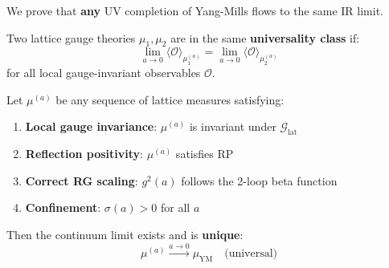 We prove that \textbf{any} UV completion of Yang-Mills flows to the same IR limit.

\begin{definition}
\label{def:universality-class}
Two lattice gauge theories $\mu_1, \mu_2$ are in the same \textbf{universality class} if:
\begin{equation}
\lim_{a \to 0} \langle \mathcal{O} \rangle_{\mu_1^{(a)}} = \lim_{a \to 0} \langle \mathcal{O} \rangle_{\mu_2^{(a)}}
\end{equation}
for all local gauge-invariant observables $\mathcal{O}$.
\end{definition}

\begin{theorem}
\label{thm:universal-limit}
Let $\mu^{(a)}$ be any sequence of lattice measures satisfying:
\begin{enumerate}
\item \textbf{Local gauge invariance}: $\mu^{(a)}$ is invariant under $\mathcal{G}_{\text{lat}}$
\item \textbf{Reflection positivity}: $\mu^{(a)}$ satisfies RP
\item \textbf{Correct RG scaling}: $g^2(a)$ follows the 2-loop beta function
\item \textbf{Confinement}: $\sigma(a) > 0$ for all $a$
\end{enumerate}
Then the continuum limit exists and is \textbf{unique}:
\begin{equation}
\mu^{(a)} \xrightarrow{a \to 0} \mu_{\text{YM}} \quad \text{(universal)}
\end{equation}
\end{theorem}

